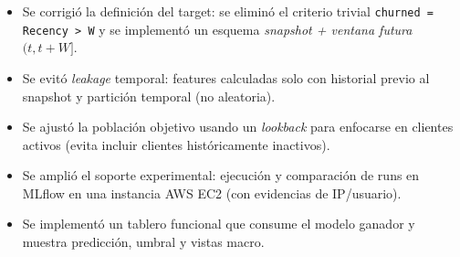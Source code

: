 \begin{itemize}
  \item Se corrigió la definición del target: se eliminó el criterio trivial \texttt{churned = Recency > W} y se implementó un esquema \textit{snapshot + ventana futura} $(t, t+W]$.
  \item Se evitó \textit{leakage} temporal: features calculadas solo con historial previo al snapshot y partición temporal (no aleatoria).
  \item Se ajustó la población objetivo usando un \textit{lookback} para enfocarse en clientes activos (evita incluir clientes históricamente inactivos).
  \item Se amplió el soporte experimental: ejecución y comparación de runs en MLflow en una instancia AWS EC2 (con evidencias de IP/usuario).
  \item Se implementó un tablero funcional que consume el modelo ganador y muestra predicción, umbral y vistas macro.
\end{itemize}